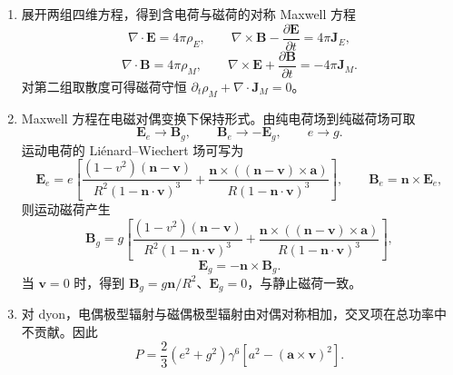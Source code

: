 \begin{question}
\begin{solution}
\begin{enumerate}
  \item 展开两组四维方程，得到含电荷与磁荷的对称 Maxwell 方程
  \[
    \boxed{\nabla\cdot\mathbf E=4\pi\rho_E,
    \qquad
    \nabla\times\mathbf B-\frac{\partial\mathbf E}{\partial t}=4\pi\mathbf J_E,}
  \]
  \[
    \boxed{\nabla\cdot\mathbf B=4\pi\rho_M,
    \qquad
    \nabla\times\mathbf E+\frac{\partial\mathbf B}{\partial t}=-4\pi\mathbf J_M .}
  \]
  对第二组取散度可得磁荷守恒 $\partial_t\rho_M+\nabla\cdot\mathbf J_M=0$。

  \item Maxwell 方程在电磁对偶变换下保持形式。由纯电荷场到纯磁荷场可取
  \[
    \mathbf E_e\to\mathbf B_g,
    \qquad
    \mathbf B_e\to-\mathbf E_g,
    \qquad
    e\to g .
  \]
  运动电荷的 Liénard--Wiechert 场可写为
  \[
    \mathbf E_e=e\left[\frac{(1-v^2)(\mathbf n-\mathbf v)}{R^2(1-\mathbf n\cdot\mathbf v)^3}
    +\frac{\mathbf n\times((\mathbf n-\mathbf v)\times\mathbf a)}{R(1-\mathbf n\cdot\mathbf v)^3}\right],
    \qquad
    \mathbf B_e=\mathbf n\times\mathbf E_e,
  \]
  则运动磁荷产生
  \[
    \boxed{\mathbf B_g=g\left[\frac{(1-v^2)(\mathbf n-\mathbf v)}{R^2(1-\mathbf n\cdot\mathbf v)^3}
    +\frac{\mathbf n\times((\mathbf n-\mathbf v)\times\mathbf a)}{R(1-\mathbf n\cdot\mathbf v)^3}\right],}
  \]
  \[
    \boxed{\mathbf E_g=-\mathbf n\times\mathbf B_g .}
  \]
  当 $\mathbf v=0$ 时，得到 $\mathbf B_g=g\mathbf n/R^2$、$\mathbf E_g=0$，与静止磁荷一致。

  \item 对 dyon，电偶极型辐射与磁偶极型辐射由对偶对称相加，交叉项在总功率中不贡献。因此
  \[
    \boxed{P=\frac23(e^2+g^2)\gamma^6
    \left[a^2-(\mathbf a\times\mathbf v)^2\right]} .
  \]
\end{enumerate}
\end{solution}
\end{question}

